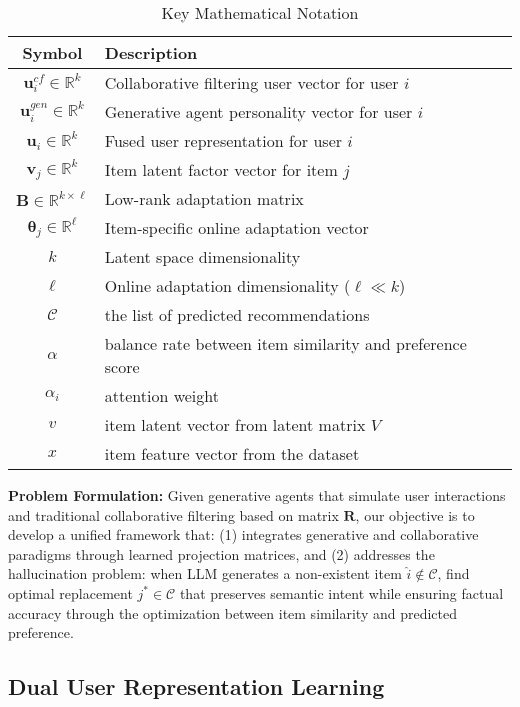 \documentclass[acmsmall]{acmart}
\begin{document}
\begin{table}[h]
\centering
\caption{Key Mathematical Notation}
\label{tab:notation}
\begin{tabular}{cl}
\hline
\textbf{Symbol} & \textbf{Description} \\
\hline
$\mathbf{u}^{cf}_i \in \mathbb{R}^k$ & Collaborative filtering user vector for user $i$ \\
$\mathbf{u}^{gen}_i \in \mathbb{R}^k$ & Generative agent personality vector for user $i$ \\
$\mathbf{u}_i \in \mathbb{R}^k$ & Fused user representation for user $i$ \\
$\mathbf{v}_j \in \mathbb{R}^k$ & Item latent factor vector for item $j$ \\
$\mathbf{B} \in \mathbb{R}^{k \times \ell}$ & Low-rank adaptation matrix \\
$\boldsymbol{\theta}_j \in \mathbb{R}^\ell$ & Item-specific online adaptation vector \\
$k$ & Latent space dimensionality \\
$\ell$ & Online adaptation dimensionality ($\ell \ll k$) \\
$\mathcal{C}$ & the list of predicted recommendations \\
$\alpha$ & balance rate between item similarity and preference score \\ 
$\alpha_i$ & attention weight \\
$v$ & item latent vector from latent matrix $V$ \\
$x$ & item feature vector from the dataset\\
\hline
\end{tabular}
\end{table}

\textbf{Problem Formulation:} Given generative agents that simulate user interactions and traditional collaborative filtering based on matrix $\mathbf{R}$, our objective is to develop a unified framework that: (1) integrates generative and collaborative paradigms through learned projection matrices, and (2) addresses the hallucination problem: when LLM generates a non-existent item $\hat{i} \notin \mathcal{C}$, find optimal replacement $j^* \in \mathcal{C}$ that preserves semantic intent while ensuring factual accuracy through the optimization between item similarity and predicted preference.
\subsection{Dual User Representation Learning}
\label{sec:dual_representation}
\end{document}
